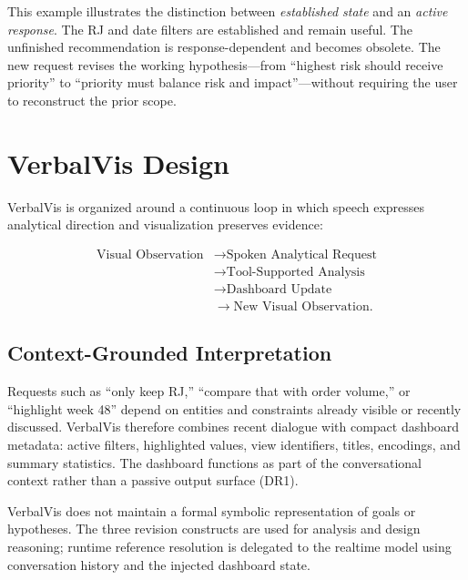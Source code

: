 \documentclass[journal]{IEEEtran}
\begin{document}
This example illustrates the distinction between \emph{established state} and an \emph{active response}. The RJ and date filters are established and remain useful. The unfinished recommendation is response-dependent and becomes obsolete. The new request revises the working hypothesis---from ``highest risk should receive priority'' to ``priority must balance risk and impact''---without requiring the user to reconstruct the prior scope.

\section{VerbalVis Design}
\label{sec:design}

VerbalVis is organized around a continuous loop in which speech expresses analytical direction and visualization preserves evidence:

\begin{equation}
\begin{split}
\text{Visual Observation}
&\rightarrow \text{Spoken Analytical Request}\\
&\rightarrow \text{Tool-Supported Analysis}\\
&\rightarrow \text{Dashboard Update}\\
&\rightarrow \text{New Visual Observation}.
\end{split}
\label{eq:interaction-loop}
\end{equation}

\subsection{Context-Grounded Interpretation}
\label{sec:design-grounding}

Requests such as ``only keep RJ,'' ``compare that with order volume,'' or ``highlight week 48'' depend on entities and constraints already visible or recently discussed. VerbalVis therefore combines recent dialogue with compact dashboard metadata: active filters, highlighted values, view identifiers, titles, encodings, and summary statistics. The dashboard functions as part of the conversational context rather than a passive output surface (DR1).

VerbalVis does not maintain a formal symbolic representation of goals or hypotheses. The three revision constructs are used for analysis and design reasoning; runtime reference resolution is delegated to the realtime model using conversation history and the injected dashboard state.
\end{document}
